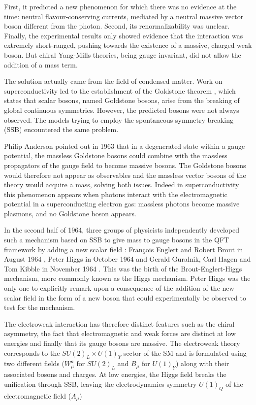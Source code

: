 First, it predicted a new phenomenon for which there was no evidence at the time: neutral flavour-conserving currents, mediated by a neutral massive vector boson different from the photon. Second, its renormalizability was unclear. Finally, the experimental results only showed evidence that the interaction was extremely short-ranged, pushing towards the existence of a massive, charged weak boson. But chiral Yang-Mills theories, being gauge invariant, did not allow the addition of a mass term.

The solution actually came from the field of condensed matter. Work on superconductivity led to the establishment of the Goldstone theorem \cite{PhysRev.127.965}, which states that scalar bosons, named Goldstone bosons, arise from the breaking of global continuous symmetries. However, the predicted bosons were not always observed. The models trying to employ the spontaneous symmetry breaking (SSB) encountered the same problem.

Philip Anderson pointed out in 1963 \cite{PhysRev.130.439} that in a degenerated state within a gauge potential, the massless Goldstone bosons could combine with the massless propagators of the gauge field to become massive bosons. The Goldstone bosons would therefore not appear as observables and the massless vector bosons of the theory would acquire a mass, solving both issues. Indeed in superconductivity this phenomenon appears when photons interact with the electromagnetic potential in a superconducting electron gas: massless photons become massive plasmons, and no Goldstone boson appears.

In the second half of 1964, three groups of physicists independently developed such a mechanism based on SSB to give mass to gauge bosons in the QFT framework by adding a new scalar field : François Englert and Robert Brout in August 1964 \cite{PhysRevLett.13.321}, Peter Higgs in October 1964 \cite{HIGGS1964132,PhysRevLett.13.508} and Gerald Guralnik, Carl Hagen and Tom Kibble in November 1964 \cite{PhysRevLett.13.585}. This was the birth of the Brout-Englert-Higgs mechanism, more commonly known as the Higgs mechanism. Peter Higgs was the only one to explicitly remark upon a consequence of the addition of the new scalar field in the form of a new boson that could experimentally be observed to test for the mechanism. 

The electroweak interaction has therefore distinct features such as the chiral asymmetry, the fact that electromagnetic and weak forces are distinct at low energies and finally that its gauge bosons are massive. The electroweak theory corresponds to the $SU(2)_L \times U(1)_Y$ sector of the SM and is formulated using two different fields ($W_{\mu}^a$ for $SU(2)_L$ and $B_{\mu}$ for $U(1)_Y$) along with their associated bosons and charges. At low energies, the Higgs field breaks the unification through SSB, leaving the electrodynamics symmetry $U(1)_Q$ of the electromagnetic field ($A_{\mu}$)

